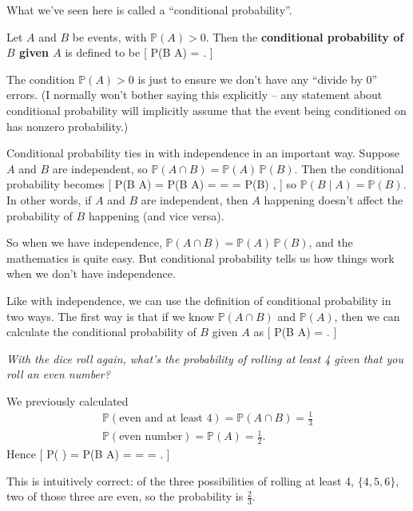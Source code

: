 \documentclass[
  letterpaper,
  DIV=11,
  numbers=noendperiod]{scrreprt}
\theoremstyle{remark}
\begin{document}
What we've seen here is called a ``conditional probability''.

Let \(A\) and \(B\) be events, with \(\mathbb P(A) > 0\). Then the
\textbf{conditional probability of \(B\) given \(A\)} is defined to be
{[} \mathbb P(B \mid A) =  . {]}

The condition \(\mathbb P(A) > 0\) is just to ensure we don't have any
``divide by 0'' errors. (I normally won't bother saying this explicitly
-- any statement about conditional probability will implicitly assume
that the event being conditioned on has nonzero probability.)

Conditional probability ties in with independence in an important way.
Suppose \(A\) and \(B\) are independent, so
\(\mathbb P(A \cap B) = \mathbb P(A) \, \mathbb P(B)\). Then the
conditional probability becomes {[} \mathbb P(B \mid A) = \mathbb P(B
\mid A) =  =
 = \mathbb P(B) , {]}
so \(\mathbb P(B \mid A) = \mathbb P(B)\). In other words, if \(A\) and
\(B\) are independent, then \(A\) happening doesn't affect the
probability of \(B\) happening (and vice versa).

So when we have independence,
\(\mathbb P(A \cap B) = \mathbb P(A)\,\mathbb P(B)\), and the
mathematics is quite easy. But conditional probability tells us how
things work when we don't have independence.

Like with independence, we can use the definition of conditional
probability in two ways. The first way is that if we know
\(\mathbb P(A \cap B)\) and \(\mathbb P(A)\), then we can calculate the
conditional probability of \(B\) given \(A\) as {[} \mathbb P(B \mid A)
=  . {]}

\emph{With the dice roll again, what's the probability of rolling at
least 4 given that you roll an even number?}

We previously calculated \begin{gather*}
\mathbb P(\text{even and at least 4}) = \mathbb P(A \cap B) = \tfrac{1}{3} \\
\mathbb P(\text{even number}) = \mathbb P(A) = \tfrac{1}{2} .
\end{gather*} Hence {[} \mathbb P( \mid {}) =
\mathbb P(B \mid A) =  =
 =  . {]}

This is intuitively correct: of the three possibilities of rolling at
least 4, \(\{4,5,6\}\), two of those three are even, so the probability
is \(\frac23\).
\end{document}

